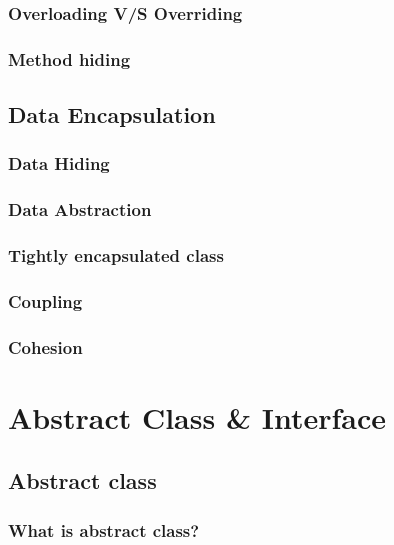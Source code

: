 \documentclass[14pt,fleqn]{extbook} %
\begin{document}
\subsection{Overloading V/S Overriding}

\subsection{Method hiding}

\section{Data Encapsulation}

\subsection{Data Hiding}

\subsection{Data Abstraction}

\subsection{Tightly encapsulated class}

\subsection{Coupling}

\subsection{Cohesion}


\chapter{Abstract Class \& Interface}
\section{Abstract class}

\subsection{What is abstract class?}

\end{document}
